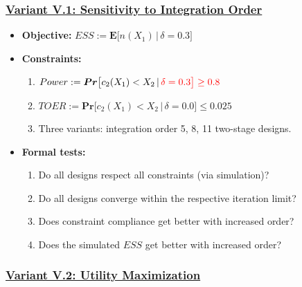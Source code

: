 \documentclass[]{book}
\providecommand{\tightlist}{%
  \setlength{\itemsep}{0pt}\setlength{\parskip}{0pt}}
\begin{document}
\hypertarget{variant-v.1-sensitivity-to-integration-order}{%
\subsubsection{\texorpdfstring{\protect\hyperlink{variantV_1}{Variant V.1: Sensitivity to Integration Order}}{Variant V.1: Sensitivity to Integration Order}}\label{variant-v.1-sensitivity-to-integration-order}}

\begin{itemize}
\tightlist
\item
  \textbf{Objective:} \(ESS := \boldsymbol{E}\big[n(X_1)\,|\,\delta=0.3\big]\)
\item
  \textbf{Constraints:}

  \begin{enumerate}
  \def\labelenumi{\arabic{enumi}.}
  \tightlist
  \item
    \(Power := \boldsymbol{Pr}\big[c_2(X_1) < X_2\,|\,\color{red}{\delta=0.3}\big] \geq 0.8\)
  \item
    \(TOER := \boldsymbol{Pr}\big[c_2(X_1) < X_2\,|\,\delta=0.0\big] \leq 0.025\)
  \item
    Three variants: integration order 5, 8, 11 two-stage designs.
  \end{enumerate}
\item
  \textbf{Formal tests:}

  \begin{enumerate}
  \def\labelenumi{\arabic{enumi}.}
  \tightlist
  \item
    Do all designs respect all constraints (via simulation)?
  \item
    Do all designs converge within the respective iteration limit?
  \item
    Does constraint compliance get better with increased order?
  \item
    Does the simulated \(ESS\) get better with increased order?
  \end{enumerate}
\end{itemize}

\hypertarget{variant-v.2-utility-maximization}{%
\subsubsection{\texorpdfstring{\protect\hyperlink{variantV_2}{Variant V.2: Utility Maximization}}{Variant V.2: Utility Maximization}}\label{variant-v.2-utility-maximization}}
\end{document}
